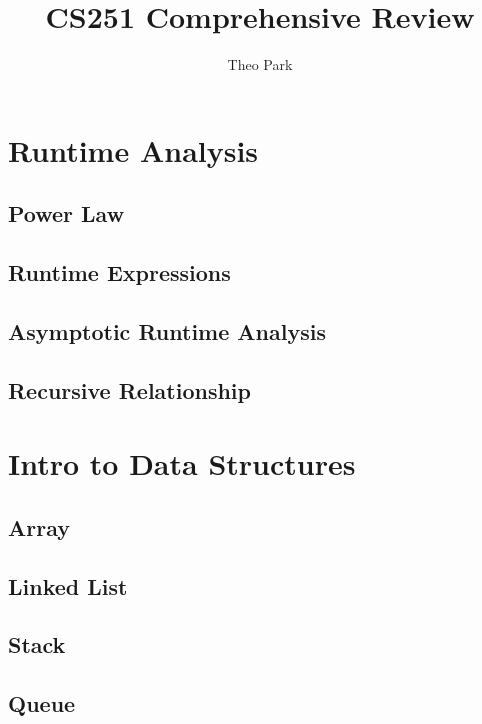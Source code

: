 \documentclass{article}
\title{CS251 Comprehensive Review}
\author{Theo Park}
\date{}
\begin{document}
\maketitle

\pagestyle{fancy}

\tableofcontents

\section{Runtime Analysis}

\subsection{Power Law}

\subsection{Runtime Expressions}

\subsection{Asymptotic Runtime Analysis}

\subsection{Recursive Relationship}

\section{Intro to Data Structures}

\subsection{Array}

\subsection{Linked List}

\subsection{Stack}

\subsection{Queue}
\end{document}
